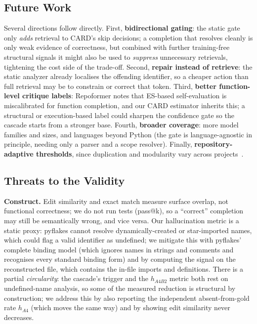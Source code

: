 \documentclass[10pt,conference]{IEEEtran}
\newcommand{\new}[1]{{\color{blue}#1}}
\begin{document}
\subsection{Future Work}
\label{sec:future}
Several directions follow directly. First, \new{\textbf{bidirectional gating}: the
static gate only \emph{adds} retrieval to CARD's skip decisions; a completion that
resolves cleanly is only weak evidence of correctness, but combined with further
training-free structural signals it might also be used to \emph{suppress}
unnecessary retrievals, tightening the cost side of the trade-off.} Second, \textbf{repair instead
of retrieve}: the static analyzer already localises the offending identifier, so a
cheaper action than full retrieval may be to constrain or correct that token.
Third, \textbf{better function-level critique labels}: Repoformer notes that
ES-based self-evaluation is miscalibrated for function completion, and our CARD
estimator inherits this; a structural or execution-based label could sharpen the
confidence gate so the cascade starts from a stronger base. Fourth,
\textbf{broader coverage}: more model families and sizes, and languages beyond
Python (the gate is language-agnostic in principle, needing only a parser and a
scope resolver). Finally, \textbf{repository-adaptive thresholds}, since duplication
and modularity vary across projects~\cite{zhang2023repocoder}.

\subsection{Threats to the Validity}
\label{sec:threats}
\textbf{Construct.} Edit similarity and exact match measure surface overlap, not
functional correctness; we do not run tests (pass@k), so a ``correct'' completion
may still be semantically wrong, and vice versa. Our hallucination metric is a
static proxy: pyflakes cannot resolve dynamically-created or star-imported names,
which could flag a valid identifier as undefined; \new{we mitigate this with
pyflakes' complete binding model (which ignores names in strings and comments and
recognises every standard binding form) and by computing the signal on the
reconstructed file, which contains the in-file imports and definitions}. There is a partial
\emph{circularity}: the cascade's trigger and the $h_{A4B2}$ metric both rest on
undefined-name analysis, so some of the measured reduction is structural by
construction; we address this by also reporting the independent absent-from-gold
rate $h_{A4}$ (which moves the same way) and by showing edit similarity never
decreases.
\end{document}

